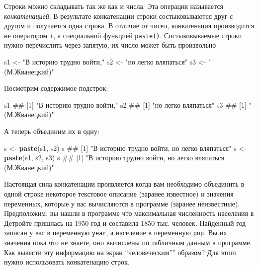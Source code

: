 \documentclass[]{book}
\newenvironment{Shaded}{\begin{snugshade}}{\end{snugshade}}
\newcommand{\KeywordTok}[1]{\textcolor[rgb]{0.13,0.29,0.53}{\textbf{#1}}}
\newcommand{\StringTok}[1]{\textcolor[rgb]{0.31,0.60,0.02}{#1}}
\newcommand{\NormalTok}[1]{#1}
\begin{document}
Строки можно складывать так же как и числа. Эта операция называется
\emph{конкатенацией}. В результате конкатенации строки состыковываются
друг с другом и получается одна строка. В отличие от чисел, конкатенация
производится не оператором \texttt{+}, а специальной функцией
\texttt{paste()}. Состыковываемые строки нужно перечислить через
запятую, их число может быть произвольно

\begin{Shaded}
\begin{Highlighting}[]
\NormalTok{s1 <-}\StringTok{ "В историю трудно войти,"}
\NormalTok{s2 <-}\StringTok{ "но легко вляпаться"}
\NormalTok{s3 <-}\StringTok{ "(М.Жванецкий)"}
\end{Highlighting}
\end{Shaded}

Посмотрим содержимое подстрок:

\begin{Shaded}
\begin{Highlighting}[]
\NormalTok{s1}
\NormalTok{## [1] "В историю трудно войти,"}
\NormalTok{s2}
\NormalTok{## [1] "но легко вляпаться"}
\NormalTok{s3}
\NormalTok{## [1] "(М.Жванецкий)"}
\end{Highlighting}
\end{Shaded}

А теперь объединим их в одну:

\begin{Shaded}
\begin{Highlighting}[]
\NormalTok{s <-}\StringTok{ }\KeywordTok{paste}\NormalTok{(s1, s2)}
\NormalTok{s}
\NormalTok{## [1] "В историю трудно войти, но легко вляпаться"}
\NormalTok{s <-}\StringTok{ }\KeywordTok{paste}\NormalTok{(s1, s2, s3)}
\NormalTok{s}
\NormalTok{## [1] "В историю трудно войти, но легко вляпаться (М.Жванецкий)"}
\end{Highlighting}
\end{Shaded}

Настоящая сила конкатенации проявляется когда вам необходимо объединить
в одной строке некоторое текстовое описание (заранее известное) и
значения переменных, которые у вас вычисляются в программе (заранее
неизвестные). Предположим, вы нашли в программе что максимальная
численность населения в Детройте пришлась на 1950 год и составила 1850
тыс. человек. Найденный год записан у вас в переменную \texttt{year}, а
население в переменную \texttt{pop}. Вы их значения пока что не знаете,
они вычислены по табличным данным в программе. Как вывести эту
информацию на экран ``человеческим''" образом? Для этого нужно
использовать конкатенацию строк.
\end{document}
